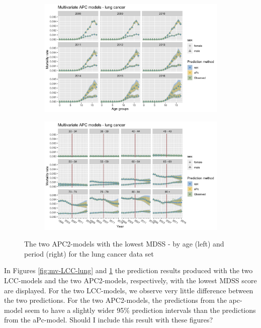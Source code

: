 \begin{figure}
    \centering
    \begin{subfigure}[b]{.45\linewidth}
        \includegraphics[width=\linewidth]{real-data/real-data-multivariate/Figures/multivariate-APC-by-age-lung.png}
    \end{subfigure}
    \begin{subfigure}[b]{.45\linewidth}
        \includegraphics[width=\linewidth]{real-data/real-data-multivariate/Figures/multivariate-APC-by-period-lung.png}
    \end{subfigure}
    \caption{The two APC2-models with the lowest MDSS - by age (left) and period (right) for the lung cancer data set}
    \label{fig:mv-APC-lung}
\end{figure}

\newpar In Figures \ref{fig:mv-LCC-lung} and \ref{fig:mv-APC-lung} the prediction results produced with the two LCC-models and the two APC2-models, respectively, with the lowest MDSS score are displayed. For the two LCC-models, we observe very little difference between the two predictions. For the two APC2-models, the predictions from the apc-model seem to have a slightly wider 95\% prediction intervals than the predictions from the aPc-model. \textcolor{myDarkBlue}{Should I include this result with these figures?}

